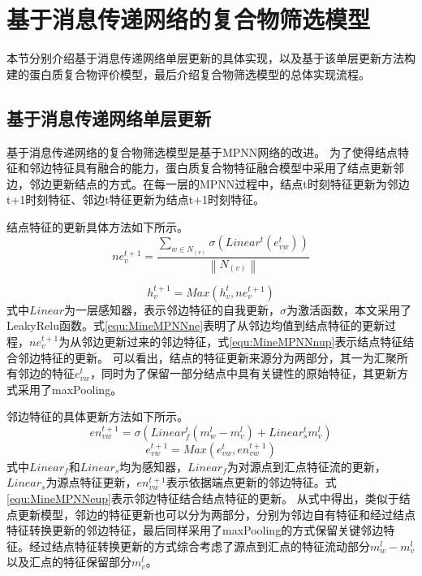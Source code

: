 \section{基于消息传递网络的复合物筛选模型}
\label{section:MPNN:detail}

本节分别介绍基于消息传递网络单层更新的具体实现，以及基于该单层更新方法构建的蛋白质复合物评价模型，最后介绍复合物筛选模型的总体实现流程。

\subsection{基于消息传递网络单层更新}
\label{section:MPNN:update}
基于消息传递网络的复合物筛选模型是基于MPNN网络的改进。
为了使得结点特征和邻边特征具有融合的能力，蛋白质复合物特征融合模型中采用了结点更新邻边，邻边更新结点的方式。在每一层的MPNN过程中，结点t时刻特征更新为邻边t+1时刻特征、邻边t特征更新为结点t+1时刻特征。

结点特征的更新具体方法如下所示。
\begin{equation}
    \label{equ:MineMPNNne}
    ne_v^{t+1} = \frac{\sum_{w \in N_{(v)}}\sigma (Linear^t(e_{vw}^t))}{\left\lVert N_{(v)}\right\rVert }
\end{equation}

\begin{equation}
    \label{equ:MineMPNNnup}
    h_v^{t+1} = Max(h_v^t,ne_v^{t+1})
\end{equation}
式中$Linear$为一层感知器，表示邻边特征的自我更新，$\sigma $为激活函数，本文采用了LeakyRelu函数。式\ref{equ:MineMPNNne}表明了从邻边均值到结点特征的更新过程，$ne_v^{t+1}$为从邻边更新过来的邻边特征，式\ref{equ:MineMPNNnup}表示结点特征结合邻边特征的更新。
可以看出，结点的特征更新来源分为两部分，其一为汇聚所有邻边的特征$e_{vw}^t$，同时为了保留一部分结点中具有关键性的原始特征，其更新方式采用了maxPooling。

邻边特征的具体更新方法如下所示。
\begin{equation}
    \label{equ:MineMPNNen}
    en_{vw}^{t+1} = \sigma (Linear_f^t(m_w^{l} - m_v^{l}) + Linear_s^t m_v^{l})
\end{equation}
\begin{equation}
    \label{equ:MineMPNNeup}
    e_{vw}^{t+1} = Max(e_{vw}^t,en_{vw}^{t+1})
\end{equation}
式中$Linear_f$和$Linear_s$均为感知器，$Linear_f$为对源点到汇点特征流的更新，$Linear_s$为源点特征更新，$en_{vw}^{t+1}$表示依据端点更新的邻边特征。式\ref{equ:MineMPNNeup}表示邻边特征结合结点特征的更新。
从式中得出，类似于结点更新模型，邻边的特征更新也可以分为两部分，分别为邻边自有特征和经过结点特征转换更新的邻边特征，最后同样采用了maxPooling的方式保留关键邻边特征。经过结点特征转换更新的方式综合考虑了源点到汇点的特征流动部分$m_w^{l} - m_v^{l}$以及汇点的特征保留部分$m_v^{l}$。

